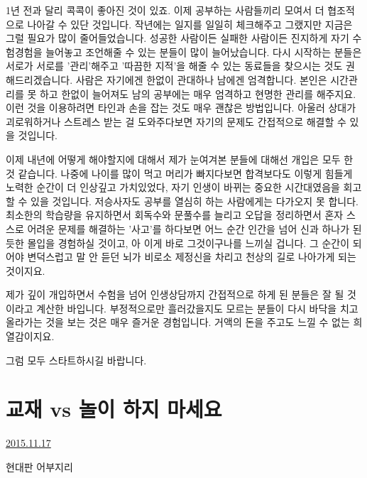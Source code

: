 1년 전과 달리 콕콕이 좋아진 것이 있죠. 이제 공부하는 사람들끼리 모여서 더 협조적으로 나아갈 수 있단 것입니다.
작년에는 일지를 일일히 체크해주고 그랬지만 지금은 그럴 필요가 많이 줄어들었습니다.
성공한 사람이든 실패한 사람이든 진지하게 자기 수험경험을 늘어놓고 조언해줄 수 있는 분들이 많이 늘어났습니다.
다시 시작하는 분들은 서로가 서로를 '관리'해주고 '따끔한 지적'을 해줄 수 있는 동료들을 찾으시는 것도 권해드리겠습니다.
사람은 자기에겐 한없이 관대하나 남에겐 엄격합니다.
본인은 시간관리를 못 하고 한없이 늘어져도 남의 공부에는 매우 엄격하고 현명한 관리를 해주지요.
이런 것을 이용하려면 타인과 손을 잡는 것도 매우 괜찮은 방법입니다.
아울러 상대가 괴로워하거나 스트레스 받는 걸 도와주다보면 자기의 문제도 간접적으로 해결할 수 있을 것입니다.
\vspace{5mm}

이제 내년에 어떻게 해야할지에 대해서 제가 눈여겨본 분들에 대해선 개입은 모두 한 것 같습니다.
나중에 나이를 많이 먹고 머리가 빠지다보면
합격보다도 이렇게 힘들게 노력한 순간이 더 인상깊고 가치있었다, 자기 인생이 바뀌는 중요한 시간대였음을 회고할 수 있을 것입니다.
저승사자도 공부를 열심히 하는 사람에게는 다가오지 못 합니다.
최소한의 학습량을 유지하면서 회독수와 문풀수를 늘리고 오답을 정리하면서 혼자 스스로 어려운 문제를 해결하는 '사고'를 하다보면
어느 순간 인간을 넘어 신과 하나가 된 듯한 몰입을 경험하실 것이고, 아 이게 바로 그것이구나를 느끼실 겁니다.
그 순간이 되어야 변덕스럽고 말 안 듣던 뇌가 비로소 제정신을 차리고 천상의 길로 나아가게 되는 것이지요.
\vspace{5mm}

제가 깊이 개입하면서 수험을 넘어 인생상담까지 간접적으로 하게 된 분들은 잘 될 것이라고  계산한 바입니다.
부정적으로만 흘러갔을지도 모르는 분들이 다시 바닥을 치고 올라가는 것을 보는 것은 매우 즐거운 경험입니다.
거액의 돈을 주고도 느낄 수 없는 희열감이지요.
\vspace{5mm}

그럼 모두 스타트하시길 바랍니다.
\vspace{5mm}






\section{교재 vs 놀이 하지 마세요}
\href{https://www.kockoc.com/Apoc/494964}{2015.11.17}

\vspace{5mm}

현대판 어부지리
\vspace{5mm}

